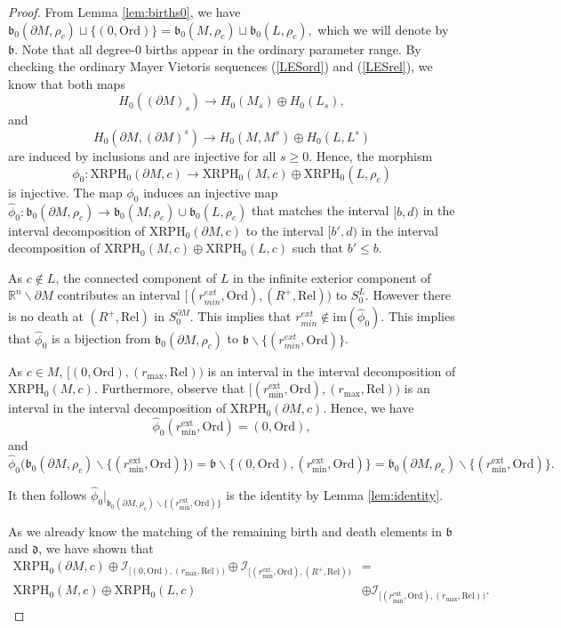\documentclass[a4paper,11pt]{article}
\theoremstyle{definition}
\newcommand{\birth}{\mathfrak{b}}
\newcommand{\R}{\mathbb{R}}
\newcommand{\im}{\text{im}}
\begin{document}
\begin{proof}
From Lemma \ref{lem:births0}, we have 
$\mathfrak{b}_0(\partial M,\rho_c)\sqcup \{(0,\text{Ord})\} = \mathfrak{b}_0(M,\rho_c)\sqcup \mathfrak{b}_0(L,\rho_c),$ which we will denote by $\mathfrak{b}$. Note that all degree-$0$ births appear in the ordinary parameter range.
By checking the ordinary Mayer Vietoris sequences (\ref{LESord}) and (\ref{LESrel}), we know that both maps
$$H_0((\partial M)_s)\to H_0(M_s)\oplus H_0(L_s),$$ and 
$$H_0(\partial M,(\partial M)^s)\to H_0(M,M^s)\oplus H_0(L,L^s)$$ are induced by inclusions and are injective for all $s\ge 0$. Hence, the morphism 
$$\phi_0:  \text{XRPH}_0(\partial M,c)\to\text{XRPH}_0(M,c)\oplus\text{XRPH}_0(L,\rho_c)$$ is injective. The map $\phi_0$ induces an injective map $\hat{\phi}_0: \mathfrak{b}_0(\partial M,\rho_c)\to\birth_0(M, \rho_c)\cup \birth_0(L, \rho_c)$ that matches the interval $[b,d)$ in the interval decomposition of $\text{XRPH}_0(\partial M, c)$ to the interval $[b',d)$ in the interval decomposition of $\text{XRPH}_0(M,c)\oplus \text{XRPH}_0(L,c)$ such that $b'\leq b$.

As $c\notin L$, the connected component of $L$ in the infinite exterior component of $\R^n\backslash \partial M$ contributes an interval $[
(r_{min}^{ext}, \text{Ord}), (R^+, \text{Rel}))$ to $S^L_0$. However there is no death at $(R^+, \text{Rel})$ in $S^{\partial{M}}_0$. This implies that $r_{min}^{ext}\notin \im(\hat{\phi}_0)$. This implies that $\hat{\phi}_0$ is a bijection from $\mathfrak{b}_0(\partial M,\rho_c)$ to $\mathfrak{b}\backslash \{(r_{min}^{ext}, \text{Ord})\}$.


As $c\in M$, $[(0,\text{Ord}),(r_{\max}, \text{Rel}))$ is an interval in the interval decomposition of $\text{XRPH}_0(M,c)$. Furthermore, observe that $[(r_{\min}^\mathrm{ext},\text{Ord}),(r_{\max}, \text{Rel}))$ is an interval in the interval decomposition of $\text{XRPH}_0(\partial M,c)$. 
Hence, we have 
$$\hat{\phi}_0(r_{\min}^\mathrm{ext},\text{Ord})=(0,\text{Ord}),$$ and 
$$\hat{\phi}_0\big(\mathfrak{b}_0(\partial M,\rho_c)\backslash \{(r_{\min}^\mathrm{ext},\text{Ord})\}\big) = \mathfrak{b}\backslash \{(0,\text{Ord}), (r_{\min}^\mathrm{ext},\text{Ord})\} = \mathfrak{b}_0(\partial M,\rho_c)\backslash \{(r_{\min}^\mathrm{ext},\text{Ord})\}.$$ 


It then follows $\hat{\phi}_0\vert_{\mathfrak{b}_0(\partial M,\rho_c)\backslash\{(r_{\min}^\mathrm{ext},\text{Ord})\}}$ is the identity by Lemma \ref{lem:identity}.


As we already know the matching of the remaining birth and death elements in $\mathfrak{b}$ and $\mathfrak{d}$, we have shown that \begin{align}\label{eq:k=0cimM}\text{XRPH}_0(\partial M,c)\oplus \mathcal{I}_{[(0,\text{Ord}),(r_{\max},\text{Rel}))}\oplus \mathcal{I}_{[(r_{\min}^\mathrm{ext},\text{Ord}),(R^+,\text{Rel}))}&= \\ \text{XRPH}_0(M,c)\oplus \text{XRPH}_0(L,c)&\oplus \mathcal{I}_{[(r_{\min}^\mathrm{ext},\text{Ord}),(r_{\max},\text{Rel}))}. \end{align}



\end{proof}
\end{document}
